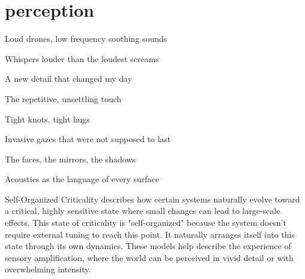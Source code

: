 \chapter*{perception}
\begin{center}
\vspace{2cm}
\begin{flushright}


Loud drones, low frequency soothing sounds

Whispers louder than the loudest screams

A new detail that changed my day

The repetitive, unsettling touch

Tight knots, tight hugs

Invasive gazes that were not supposed to last

The faces, the mirrors, the shadows

Acoustics as the language of every surface

\end{flushright}
\vspace{2cm}
\end{center}
\normalsize

Self-Organized Criticality describes how certain systems naturally evolve toward a critical, highly sensitive state where small changes can lead to large-scale effects. This state of criticality is "self-organized" because the system doesn’t require external tuning to reach this point. It naturally arranges itself into this state through its own dynamics. These models help describe the experience of sensory amplification, where the world can be perceived in vivid detail or with overwhelming intensity. \citep{adami1993}



